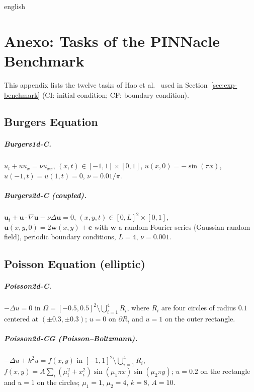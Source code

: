 \documentclass[0000.tex]{subfiles}
\begin{document}

\begin{hyphenrules}{english}

\chapter{Anexo: Tasks of the PINNacle Benchmark}\label{app:benchmark}

This appendix lists the twelve tasks of Hao et al.~\cite{hao2024pinnacle} used in Section~\ref{sec:exp-benchmark}
(CI: initial condition; CF: boundary condition).

\section{Burgers Equation}
\paragraph{Burgers1d-C.} $u_t+uu_x=\nu u_{xx}$, $(x,t)\in[-1,1]\times[0,1]$, $u(x,0)=-\sin(\pi x)$,
$u(-1,t)=u(1,t)=0$, $\nu=0.01/\pi$.

\paragraph{Burgers2d-C (coupled).} $\mathbf{u}_t+\mathbf{u}\cdot\nabla\mathbf{u}-\nu\Delta\mathbf{u}=0$,
$(x,y,t)\in[0,L]^2\times[0,1]$, $\mathbf{u}(x,y,0)=2\mathbf{w}(x,y)+\mathbf{c}$ with $\mathbf{w}$ a random
Fourier series (Gaussian random field), periodic boundary conditions, $L=4$, $\nu=0.001$.

\section{Poisson Equation (elliptic)}
\paragraph{Poisson2d-C.} $-\Delta u=0$ in $\Omega=[-0.5,0.5]^2\setminus\bigcup_{i=1}^{4}R_i$, where $R_i$
are four circles of radius $0.1$ centered at $(\pm0.3,\pm0.3)$; $u=0$ on $\partial R_i$ and $u=1$ on the
outer rectangle.

\paragraph{Poisson2d-CG (Poisson--Boltzmann).} $-\Delta u+k^2u=f(x,y)$ in
$[-1,1]^2\setminus\bigcup_{i=1}^{4}R_i$, $f(x,y)=A\sum_i(\mu_i^2+x_i^2)\sin(\mu_1\pi x)\sin(\mu_2\pi y)$;
$u=0.2$ on the rectangle and $u=1$ on the circles; $\mu_1=1$, $\mu_2=4$, $k=8$, $A=10$.


\end{hyphenrules}
\end{document}
